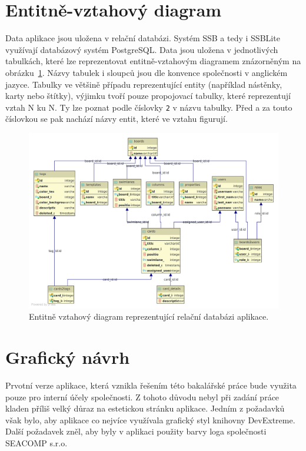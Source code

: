 \section{Entitně-vztahový diagram}
Data aplikace jsou uložena v relační databázi. Systém SSB a tedy i SSBLite využívají databázový systém PostgreSQL. Data jsou uložena v jednotlivých tabulkách, které lze reprezentovat entitně-vztahovým diagramem znázorněným na obrázku~\ref{img:erd}. Názvy tabulek i sloupců jsou dle konvence společnosti v anglickém jazyce. Tabulky ve většině případu reprezentující entity (například nástěnky, karty nebo štítky), výjimku tvoří pouze propojovací tabulky, které reprezentují vztah N ku N. Ty lze poznat podle číslovky \texttt{2} v názvu tabulky. Před a za touto číslovkou se pak nachází názvy entit, které ve vztahu figurují.

\begin{figure}[H]
	\centering
	\label{img:erd}
	\includegraphics[width=\textwidth]{obrazky-figures/erd.pdf}
	\caption{Entitně vztahový diagram reprezentující relační databázi aplikace.}
\end{figure}

\section{Grafický návrh}
Prvotní verze aplikace, která vznikla řešením této bakalářské práce bude využita pouze pro interní účely společnosti. Z tohoto důvodu nebyl při zadání práce kladen příliš velký důraz na estetickou stránku aplikace. Jedním z požadavků však bylo, aby aplikace co nejvíce využívala grafický styl knihovny DevExtreme. Další požadavek zněl, aby byly v aplikaci použity barvy loga společnosti SEACOMP s.r.o.

